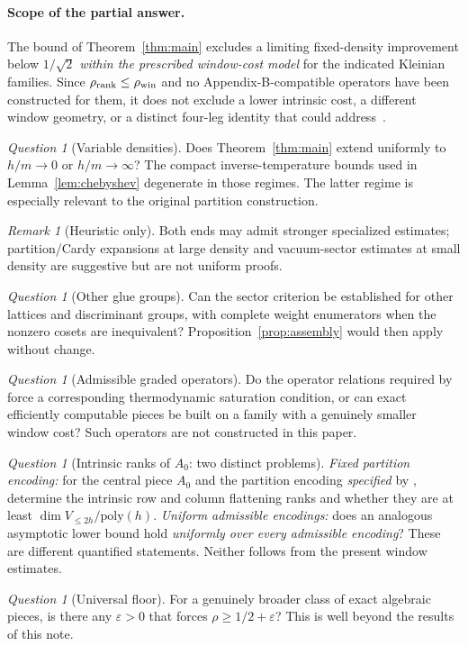 \documentclass[10pt,a4paper]{article}
\numberwithin{equation}{section}
\theoremstyle{remark}\newtheorem{remark}[theorem]{Remark}\newtheorem{question}[theorem]{Question}
\newcommand{\rhow}{\rho_{\mathrm{win}}}\newcommand{\F}{\mathbb F}\newcommand{\K}{\mathbb K}\newcommand{\Z}{\mathbb Z}\newcommand{\R}{\mathbb R}\newcommand{\cB}{\mathcal L}\newcommand{\wt}{\mathrm{wt}}\newcommand{\dimn}{\operatorname{dim}}\newcommand{\supp}{\operatorname{supp}}
\begin{document}
\paragraph{Scope of the partial answer.}
The bound of Theorem~\ref{thm:main} excludes a limiting fixed-density improvement below $1/\sqrt2$ \emph{within the prescribed window-cost model} for the indicated Kleinian families. Since $\rho_{\rm rank}\le\rhow$ and no Appendix-B-compatible operators have been constructed for them, it does not exclude a lower intrinsic cost, a different window geometry, or a distinct four-leg identity that could address~\cite[Problem~1]{majdoddin}.
\begin{question}[Variable densities]\label{q:density}
Does Theorem~\ref{thm:main} extend uniformly to $h/m\to0$ or $h/m\to\infty$? The compact inverse-temperature bounds used in Lemma~\ref{lem:chebyshev} degenerate in those regimes. The latter regime is especially relevant to the original partition construction.
\end{question}
\begin{remark}[Heuristic only]Both ends may admit stronger specialized estimates; partition/Cardy expansions at large density and vacuum-sector estimates at small density are suggestive but are not uniform proofs.\end{remark}
\begin{question}[Other glue groups]\label{q:other}
Can the sector criterion be established for other lattices and discriminant groups, with complete weight enumerators when the nonzero cosets are inequivalent? Proposition~\ref{prop:assembly} would then apply without change.
\end{question}
\begin{question}[Admissible graded operators]\label{q:operators}
Do the operator relations required by \cite[Appendix B]{claude3sat} force a corresponding thermodynamic saturation condition, or can exact efficiently computable pieces be built on a family with a genuinely smaller window cost? Such operators are not constructed in this paper.
\end{question}
\begin{question}[Intrinsic ranks of $A_0$: two distinct problems]\label{q:ranks}
\emph{Fixed partition encoding:} for the central piece $A_0$ and the partition encoding \emph{specified} by \cite[Appendix B]{claude3sat}, determine the intrinsic row and column flattening ranks and whether they are at least $\dimn V_{\le2h}/\mathrm{poly}(h)$. \emph{Uniform admissible encodings:} does an analogous asymptotic lower bound hold \emph{uniformly over every admissible encoding}? These are different quantified statements. Neither follows from the present window estimates.
\end{question}
\begin{question}[Universal floor]
For a genuinely broader class of exact algebraic pieces, is there any $\varepsilon>0$ that forces $\rho\ge1/2+\varepsilon$? This is well beyond the results of this note.
\end{question}
\end{document}
